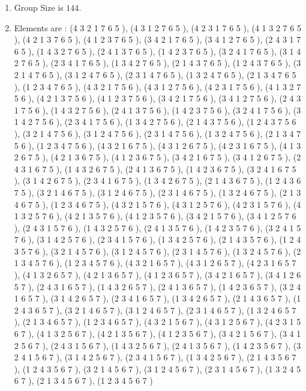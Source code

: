 \documentclass[12pt]{article}
\begin{document}
\begin{enumerate}
\item Group Size is $144$.
\item Elements are : (4 3 2 1 7 6 5  ), (4 3 1 2 7 6 5  ), (4 2 3 1 7 6 5  ), (4 1 3 2 7 6 5  ), (4 2 1 3 7 6 5  ), (4 1 2 3 7 6 5  ), (3 4 2 1 7 6 5  ), (3 4 1 2 7 6 5  ), (2 4 3 1 7 6 5  ), (1 4 3 2 7 6 5  ), (2 4 1 3 7 6 5  ), (1 4 2 3 7 6 5  ), (3 2 4 1 7 6 5  ), (3 1 4 2 7 6 5  ), (2 3 4 1 7 6 5  ), (1 3 4 2 7 6 5  ), (2 1 4 3 7 6 5  ), (1 2 4 3 7 6 5  ), (3 2 1 4 7 6 5  ), (3 1 2 4 7 6 5  ), (2 3 1 4 7 6 5  ), (1 3 2 4 7 6 5  ), (2 1 3 4 7 6 5  ), (1 2 3 4 7 6 5  ), (4 3 2 1 7 5 6  ), (4 3 1 2 7 5 6  ), (4 2 3 1 7 5 6  ), (4 1 3 2 7 5 6  ), (4 2 1 3 7 5 6  ), (4 1 2 3 7 5 6  ), (3 4 2 1 7 5 6  ), (3 4 1 2 7 5 6  ), (2 4 3 1 7 5 6  ), (1 4 3 2 7 5 6  ), (2 4 1 3 7 5 6  ), (1 4 2 3 7 5 6  ), (3 2 4 1 7 5 6  ), (3 1 4 2 7 5 6  ), (2 3 4 1 7 5 6  ), (1 3 4 2 7 5 6  ), (2 1 4 3 7 5 6  ), (1 2 4 3 7 5 6  ), (3 2 1 4 7 5 6  ), (3 1 2 4 7 5 6  ), (2 3 1 4 7 5 6  ), (1 3 2 4 7 5 6  ), (2 1 3 4 7 5 6  ), (1 2 3 4 7 5 6  ), (4 3 2 1 6 7 5  ), (4 3 1 2 6 7 5  ), (4 2 3 1 6 7 5  ), (4 1 3 2 6 7 5  ), (4 2 1 3 6 7 5  ), (4 1 2 3 6 7 5  ), (3 4 2 1 6 7 5  ), (3 4 1 2 6 7 5  ), (2 4 3 1 6 7 5  ), (1 4 3 2 6 7 5  ), (2 4 1 3 6 7 5  ), (1 4 2 3 6 7 5  ), (3 2 4 1 6 7 5  ), (3 1 4 2 6 7 5  ), (2 3 4 1 6 7 5  ), (1 3 4 2 6 7 5  ), (2 1 4 3 6 7 5  ), (1 2 4 3 6 7 5  ), (3 2 1 4 6 7 5  ), (3 1 2 4 6 7 5  ), (2 3 1 4 6 7 5  ), (1 3 2 4 6 7 5  ), (2 1 3 4 6 7 5  ), (1 2 3 4 6 7 5  ), (4 3 2 1 5 7 6  ), (4 3 1 2 5 7 6  ), (4 2 3 1 5 7 6  ), (4 1 3 2 5 7 6  ), (4 2 1 3 5 7 6  ), (4 1 2 3 5 7 6  ), (3 4 2 1 5 7 6  ), (3 4 1 2 5 7 6  ), (2 4 3 1 5 7 6  ), (1 4 3 2 5 7 6  ), (2 4 1 3 5 7 6  ), (1 4 2 3 5 7 6  ), (3 2 4 1 5 7 6  ), (3 1 4 2 5 7 6  ), (2 3 4 1 5 7 6  ), (1 3 4 2 5 7 6  ), (2 1 4 3 5 7 6  ), (1 2 4 3 5 7 6  ), (3 2 1 4 5 7 6  ), (3 1 2 4 5 7 6  ), (2 3 1 4 5 7 6  ), (1 3 2 4 5 7 6  ), (2 1 3 4 5 7 6  ), (1 2 3 4 5 7 6  ), (4 3 2 1 6 5 7  ), (4 3 1 2 6 5 7  ), (4 2 3 1 6 5 7  ), (4 1 3 2 6 5 7  ), (4 2 1 3 6 5 7  ), (4 1 2 3 6 5 7  ), (3 4 2 1 6 5 7  ), (3 4 1 2 6 5 7  ), (2 4 3 1 6 5 7  ), (1 4 3 2 6 5 7  ), (2 4 1 3 6 5 7  ), (1 4 2 3 6 5 7  ), (3 2 4 1 6 5 7  ), (3 1 4 2 6 5 7  ), (2 3 4 1 6 5 7  ), (1 3 4 2 6 5 7  ), (2 1 4 3 6 5 7  ), (1 2 4 3 6 5 7  ), (3 2 1 4 6 5 7  ), (3 1 2 4 6 5 7  ), (2 3 1 4 6 5 7  ), (1 3 2 4 6 5 7  ), (2 1 3 4 6 5 7  ), (1 2 3 4 6 5 7  ), (4 3 2 1 5 6 7  ), (4 3 1 2 5 6 7  ), (4 2 3 1 5 6 7  ), (4 1 3 2 5 6 7  ), (4 2 1 3 5 6 7  ), (4 1 2 3 5 6 7  ), (3 4 2 1 5 6 7  ), (3 4 1 2 5 6 7  ), (2 4 3 1 5 6 7  ), (1 4 3 2 5 6 7  ), (2 4 1 3 5 6 7  ), (1 4 2 3 5 6 7  ), (3 2 4 1 5 6 7  ), (3 1 4 2 5 6 7  ), (2 3 4 1 5 6 7  ), (1 3 4 2 5 6 7  ), (2 1 4 3 5 6 7  ), (1 2 4 3 5 6 7  ), (3 2 1 4 5 6 7  ), (3 1 2 4 5 6 7  ), (2 3 1 4 5 6 7  ), (1 3 2 4 5 6 7  ), (2 1 3 4 5 6 7  ), (1 2 3 4 5 6 7  )
\end{enumerate}
\end{document}
